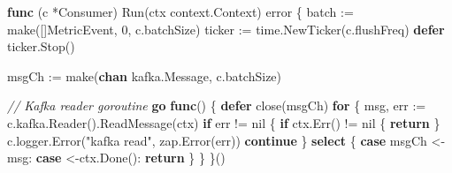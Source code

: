 \documentclass[
]{article}
\newenvironment{Shaded}{}{}
\newcommand{\BuiltInTok}[1]{\textcolor[rgb]{0.00,0.50,0.00}{#1}}
\newcommand{\CommentTok}[1]{\textcolor[rgb]{0.38,0.63,0.69}{\textit{#1}}}
\newcommand{\ControlFlowTok}[1]{\textcolor[rgb]{0.00,0.44,0.13}{\textbf{#1}}}
\newcommand{\DataTypeTok}[1]{\textcolor[rgb]{0.56,0.13,0.00}{#1}}
\newcommand{\DecValTok}[1]{\textcolor[rgb]{0.25,0.63,0.44}{#1}}
\newcommand{\KeywordTok}[1]{\textcolor[rgb]{0.00,0.44,0.13}{\textbf{#1}}}
\newcommand{\NormalTok}[1]{#1}
\newcommand{\OperatorTok}[1]{\textcolor[rgb]{0.40,0.40,0.40}{#1}}
\newcommand{\OtherTok}[1]{\textcolor[rgb]{0.00,0.44,0.13}{#1}}
\newcommand{\StringTok}[1]{\textcolor[rgb]{0.25,0.44,0.63}{#1}}
\begin{document}
\begin{Shaded}
\begin{Highlighting}[]
\KeywordTok{func} \OperatorTok{(}\NormalTok{c }\OperatorTok{*}\NormalTok{Consumer}\OperatorTok{)}\NormalTok{ Run}\OperatorTok{(}\NormalTok{ctx context}\OperatorTok{.}\NormalTok{Context}\OperatorTok{)} \DataTypeTok{error} \OperatorTok{\{}
\NormalTok{    batch }\OperatorTok{:=} \BuiltInTok{make}\OperatorTok{([]}\NormalTok{MetricEvent}\OperatorTok{,} \DecValTok{0}\OperatorTok{,}\NormalTok{ c}\OperatorTok{.}\NormalTok{batchSize}\OperatorTok{)}
\NormalTok{    ticker }\OperatorTok{:=}\NormalTok{ time}\OperatorTok{.}\NormalTok{NewTicker}\OperatorTok{(}\NormalTok{c}\OperatorTok{.}\NormalTok{flushFreq}\OperatorTok{)}
    \ControlFlowTok{defer}\NormalTok{ ticker}\OperatorTok{.}\NormalTok{Stop}\OperatorTok{()}

\NormalTok{    msgCh }\OperatorTok{:=} \BuiltInTok{make}\OperatorTok{(}\KeywordTok{chan}\NormalTok{ kafka}\OperatorTok{.}\NormalTok{Message}\OperatorTok{,}\NormalTok{ c}\OperatorTok{.}\NormalTok{batchSize}\OperatorTok{)}

    \CommentTok{// Kafka reader goroutine}
    \ControlFlowTok{go} \KeywordTok{func}\OperatorTok{()} \OperatorTok{\{}
        \ControlFlowTok{defer} \BuiltInTok{close}\OperatorTok{(}\NormalTok{msgCh}\OperatorTok{)}
        \ControlFlowTok{for} \OperatorTok{\{}
\NormalTok{            msg}\OperatorTok{,}\NormalTok{ err }\OperatorTok{:=}\NormalTok{ c}\OperatorTok{.}\NormalTok{kafka}\OperatorTok{.}\NormalTok{Reader}\OperatorTok{().}\NormalTok{ReadMessage}\OperatorTok{(}\NormalTok{ctx}\OperatorTok{)}
            \ControlFlowTok{if}\NormalTok{ err }\OperatorTok{!=} \OtherTok{nil} \OperatorTok{\{}
                \ControlFlowTok{if}\NormalTok{ ctx}\OperatorTok{.}\NormalTok{Err}\OperatorTok{()} \OperatorTok{!=} \OtherTok{nil} \OperatorTok{\{}
                    \ControlFlowTok{return}
                \OperatorTok{\}}
\NormalTok{                c}\OperatorTok{.}\NormalTok{logger}\OperatorTok{.}\NormalTok{Error}\OperatorTok{(}\StringTok{"kafka read"}\OperatorTok{,}\NormalTok{ zap}\OperatorTok{.}\NormalTok{Error}\OperatorTok{(}\NormalTok{err}\OperatorTok{))}
                \ControlFlowTok{continue}
            \OperatorTok{\}}
            \ControlFlowTok{select} \OperatorTok{\{}
            \ControlFlowTok{case}\NormalTok{ msgCh }\OperatorTok{\textless{}{-}}\NormalTok{ msg}\OperatorTok{:}
            \ControlFlowTok{case} \OperatorTok{\textless{}{-}}\NormalTok{ctx}\OperatorTok{.}\NormalTok{Done}\OperatorTok{():}
                \ControlFlowTok{return}
            \OperatorTok{\}}
        \OperatorTok{\}}
    \OperatorTok{\}()}


\end{Highlighting}
\end{Shaded}
\end{document}
